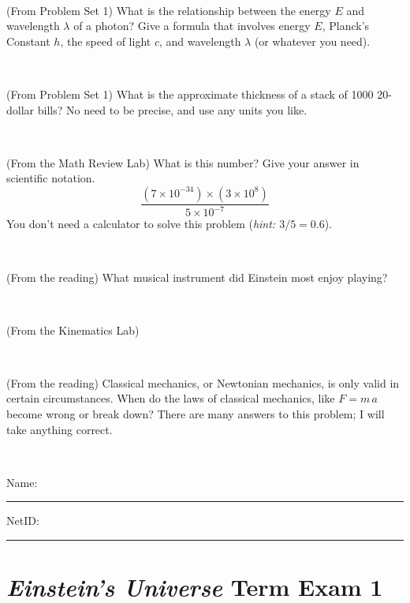 \documentclass[12pt, letterpaper]{article}
\begin{document}
\vfill ~

\begin{problem} (From Problem Set 1)
What is the relationship between the energy $E$ and wavelength
$\lambda$ of a photon? Give a formula that involves energy $E$,
Planck's Constant $h$, the speed of light $c$, and wavelength
$\lambda$ (or whatever you need).
\end{problem}

\vfill ~

\begin{problem} (From Problem Set 1)
What is the approximate thickness of a stack of 1000 20-dollar bills?
No need to be precise, and use any units you like.
\end{problem}


\vfill ~


\clearpage


\begin{problem} (From the Math Review Lab)
What is this number? Give your answer in scientific notation.
$$
\frac{(7\times10^{-34})\times(3\times10^8)}{5\times10^{-7}}
$$
You don't need a calculator to solve this problem (\textit{hint: $3/5=0.6$}).
\end{problem}


\vfill ~

\begin{problem} (From the reading)
What musical instrument did Einstein most enjoy playing?
\end{problem}


\vfill ~

\begin{problem} (From the Kinematics Lab)

\end{problem}


\vfill ~

\begin{problem} (From the reading)
Classical mechanics, or Newtonian mechanics, is only valid in certain
circumstances. When do the laws of classical mechanics, like $F =
m\,a$ become wrong or break down? There are many answers to this
problem; I will take anything correct.
\end{problem}


\vfill ~


\cleardoublepage



\noindent
Name: \rule[-1ex]{0.60\textwidth}{0.1pt}
NetID: \rule[-1ex]{0.20\textwidth}{0.1pt}

\section*{\textsl{Einstein's Universe} Term Exam 1}
\setcounter{problem}{1}
\end{document}

